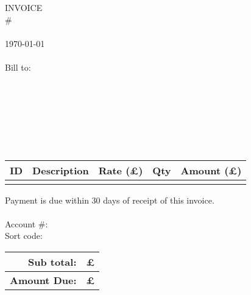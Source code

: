\documentclass[a4paper,12pt]{article}
\newcommand{\customerAddress}{}
\newcommand{\invoiceNumber}{}
\begin{document}
\noindent \parbox[t]{0.5\textwidth}{ {\Huge INVOICE}\\ \#\invoiceNumber\\ ~\\ \today\\ ~\\ {\color{gray}Bill to:}\\\noindent \customerAddress}
\hfill
\parbox[t]{0.35\textwidth}{\raggedleft {\large\myName}\\ \myAddress\\~\\ \myPhoneNumber\\ \myEmail}\\
\begin{center}
	\begin{tabular}{| >{\small\raggedright}p{} | >{\raggedright}p{} | r | c | r |}
		\hline
		\normalsize ID & Description & Rate (\pounds) & Qty & Amount (\pounds)\\
		\hline
		\invoiceInfo
		\hline
	\end{tabular}
\end{center}
\vfill
\begin{multicols}{2}
	 \noindent Payment is due within 30 days of receipt of this invoice.\\

	 \\ Account \#: \accountNumber \\ Sort code: \sortCode\\
	
	\columnbreak
	\begin{flushright}
		\begin{tabular}{ r r }
			Sub total: & \pounds\subtotal\\
			\hline
			\discount
			\shipping
			\hline \hline
			\bf Amount Due: & \bf\pounds\grandtotal
		\end{tabular}
	\end{flushright}
\end{multicols}
\end{document}
